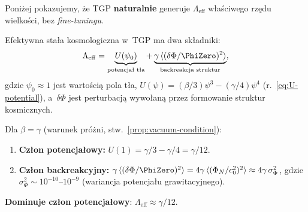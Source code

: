 Poni\.zej pokazujemy, \.ze TGP \textbf{naturalnie} generuje
$\Lambda_{\mathrm{eff}}$ w\l{}a\'sciwego rz\k{e}du wielko\'sci,
bez \emph{fine-tuningu}.

\begin{proposition}%
\label{prop:Lambda-eff}
Efektywna sta\l{}a kosmologiczna w~TGP ma dwa sk\l{}adniki:
\begin{equation}\label{eq:Lambda-eff-full}
  \Lambda_{\mathrm{eff}}
  = \underbrace{U(\psi_0)}_{\text{potencja\l{} t\l{}a}}
  + \underbrace{\gamma\,\langle(\delta\Phi/\PhiZero)^2\rangle}_{\text{backreakcja struktur}},
\end{equation}
gdzie $\psi_0 \approx 1$ jest warto\'sci\k{a} pola t\l{}a,
$U(\psi) = (\beta/3)\psi^3 - (\gamma/4)\psi^4$
(r.~\eqref{eq:U-potential}), a~$\delta\Phi$ jest perturbacj\k{a}
wywo\l{}an\k{a} przez formowanie struktur kosmicznych.

Dla $\beta = \gamma$ (warunek pr\'o\.zni, stw.~\ref{prop:vacuum-condition}):
\begin{enumerate}[nosep]
  \item \textbf{Cz\l{}on potencja\l{}owy:}
    $U(1) = \gamma/3 - \gamma/4 = \gamma/12$.
  \item \textbf{Cz\l{}on backreakcyjny:}
    $\gamma\,\langle(\delta\Phi/\PhiZero)^2\rangle
    = 4\gamma\,\langle(\Phi_N/c_0^2)^2\rangle
    \approx 4\gamma\,\sigma_\Phi^2$,
    gdzie $\sigma_\Phi^2 \sim 10^{-10}\text{--}10^{-9}$
    (wariancja potencja\l{}u grawitacyjnego).
\end{enumerate}
\textbf{Dominuje cz\l{}on potencja\l{}owy}: $\Lambda_{\mathrm{eff}} \approx \gamma/12$.
\end{proposition}

